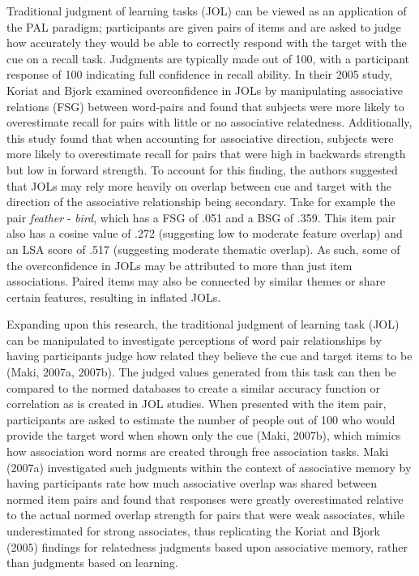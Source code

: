 \documentclass[english,,man]{apa6}
\begin{document}
Traditional judgment of learning tasks (JOL) can be viewed as an
application of the PAL paradigm; participants are given pairs of items
and are asked to judge how accurately they would be able to correctly
respond with the target with the cue on a recall task. Judgments are
typically made out of 100, with a participant response of 100 indicating
full confidence in recall ability. In their 2005 study, Koriat and Bjork
examined overconfidence in JOLs by manipulating associative relations
(FSG) between word-pairs and found that subjects were more likely to
overestimate recall for pairs with little or no associative relatedness.
Additionally, this study found that when accounting for associative
direction, subjects were more likely to overestimate recall for pairs
that were high in backwards strength but low in forward strength. To
account for this finding, the authors suggested that JOLs may rely more
heavily on overlap between cue and target with the direction of the
associative relationship being secondary. Take for example the pair
\emph{feather} - \emph{bird}, which has a FSG of .051 and a BSG of .359.
This item pair also has a cosine value of .272 (suggesting low to
moderate feature overlap) and an LSA score of .517 (suggesting moderate
thematic overlap). As such, some of the overconfidence in JOLs may be
attributed to more than just item associations. Paired items may also be
connected by similar themes or share certain features, resulting in
inflated JOLs.

Expanding upon this research, the traditional judgment of learning task
(JOL) can be manipulated to investigate perceptions of word pair
relationships by having participants judge how related they believe the
cue and target items to be (Maki, 2007a, 2007b). The judged values
generated from this task can then be compared to the normed databases to
create a similar accuracy function or correlation as is created in JOL
studies. When presented with the item pair, participants are asked to
estimate the number of people out of 100 who would provide the target
word when shown only the cue (Maki, 2007b), which mimics how association
word norms are created through free association tasks. Maki (2007a)
investigated such judgments within the context of associative memory by
having participants rate how much associative overlap was shared between
normed item pairs and found that responses were greatly overestimated
relative to the actual normed overlap strength for pairs that were weak
associates, while underestimated for strong associates, thus replicating
the Koriat and Bjork (2005) findings for relatedness judgments based
upon associative memory, rather than judgments based on learning.
\end{document}
